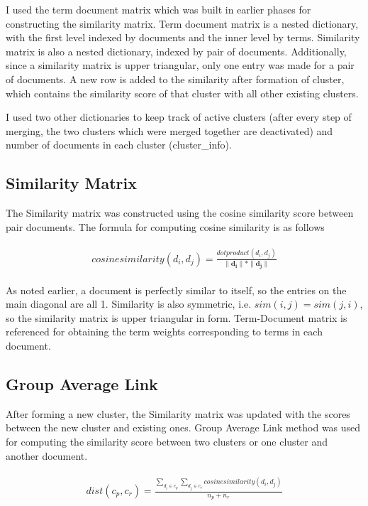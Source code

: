 \documentclass[paper=a4, fontsize=11pt]{scrartcl}
\numberwithin{equation}{section}		%
\numberwithin{figure}{section}			%
\numberwithin{table}{section}				%
\begin{document}
I used the term document matrix which was built in earlier phases for constructing the similarity matrix. Term document matrix is a nested dictionary, with the first level indexed by documents and the inner level by terms. Similarity matrix is also a nested dictionary, indexed by pair of documents. Additionally, since a similarity matrix is upper triangular, only one entry was made for a pair of documents. A new row is added to the similarity after formation of cluster, which contains the similarity score of that cluster with all other existing clusters.

I used two other dictionaries to keep track of active clusters (after every step of merging, the two clusters which were merged together are deactivated) and number of documents in each cluster (cluster\_info).


\subsection{Similarity Matrix}

The Similarity matrix was constructed using the cosine similarity score between pair documents. The formula for computing cosine similarity is as follows

\begin{align} 
	\begin{split}
	cosinesimilarity(d_{i}, d_{j}) 	= \frac{dotproduct(d_{i}, d_{j})}{\| \mathbf{d_{i}} \| * \| \mathbf{d_j} \|}
	\end{split}					
\end{align}

As noted earlier, a document is perfectly similar to itself, so the entries on the main diagonal are all 1. Similarity is also symmetric, i.e. $sim(i,j) = sim(j,i)$, so the similarity matrix is upper triangular in form. Term-Document matrix is referenced for obtaining the term weights corresponding to terms in each document.

\subsection{Group Average Link}

After forming a new cluster, the Similarity matrix was updated with the scores between the new cluster and existing ones. Group Average Link method was used for computing the similarity score between two clusters or one cluster and another document.

\begin{align} 
	\begin{split}
	dist(c_{p}, c_{r}) 	= \frac{\sum\limits_{d_{i} \in c_{p}} \sum\limits_{d_{j} \in c_{r}} cosinesimilarity(d_{i}, d_{j})}{n_{p} + n_{r}}
	\end{split}					
\end{align}
\end{document}
